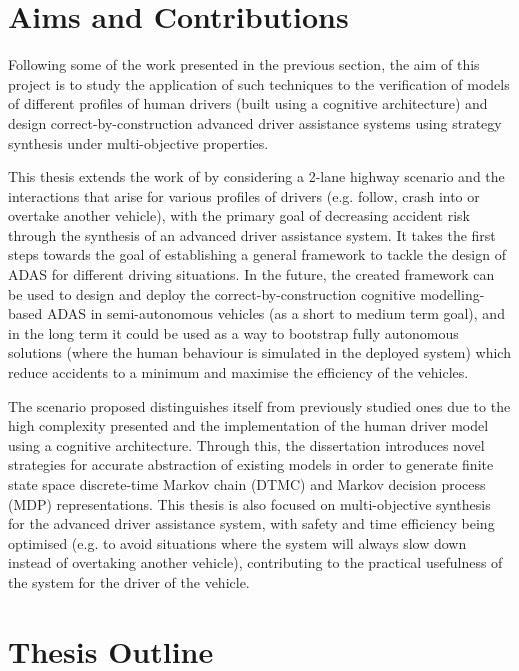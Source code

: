 \section{Aims and Contributions}

Following some of the work presented in the previous section, the aim of this project is to study the application of such techniques to the verification of models of different profiles of human drivers (built using a cognitive architecture) and design correct-by-construction advanced driver assistance systems using strategy synthesis under multi-objective properties. 

This thesis extends the work of \cite{games, lam, salvucci_1} by considering a 2-lane highway scenario and the interactions that arise for various profiles of drivers (e.g. follow, crash into or overtake another vehicle), with the primary goal of decreasing accident risk through the synthesis of an advanced driver assistance system. It takes the first steps towards the goal of establishing a general framework to tackle the design of ADAS for different driving situations. In the future, the created framework can be used to design and deploy the correct-by-construction cognitive modelling-based ADAS in semi-autonomous vehicles (as a short to medium term goal), and in the long term it could be used as a way to bootstrap fully autonomous solutions (where the human behaviour is simulated in the deployed system) which reduce accidents to a minimum and maximise the efficiency of the vehicles.

The scenario proposed distinguishes itself from previously studied ones due to the high complexity presented and the implementation of the human driver model using a cognitive architecture. Through this, the dissertation  introduces novel strategies for accurate abstraction of existing models in order to generate finite state space discrete-time Markov chain (DTMC) and Markov decision process (MDP) representations. This thesis is also focused on multi-objective synthesis for the advanced driver assistance system, with safety and time efficiency being optimised (e.g. to avoid situations where the system will always slow down instead of overtaking another vehicle), contributing to the practical usefulness of the system for the driver of the vehicle. 

\section{Thesis Outline}


